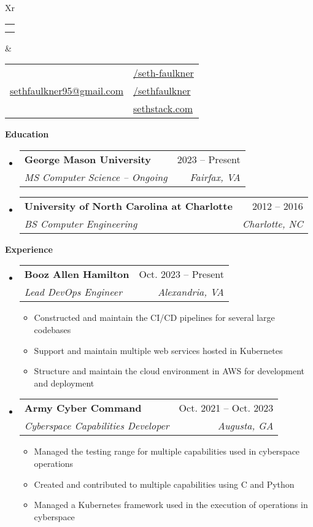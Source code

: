 \documentclass[letterpaper,12pt]{article}[leftmargin=*]
\makeatletter
\def \fullname {Seth Faulkner}
\def \subtitle {}
\def \linkedinicon {\faLinkedin}
\def \linkedinlink {https://www.linkedin.com/in/seth-faulkner-38322184/}
\def \linkedintext {/seth-faulkner}
\def \phoneicon {\faPhone}
\def \phonetext {704.277.7087}
\def \emailicon {\faEnvelope}
\def \emaillink {mailto:sethfaulkner95@gmail.com}
\def \emailtext {sethfaulkner95@gmail.com}
\def \githubicon {\faGithub}
\def \githublink {https://github.com/sethfaulkner}
\def \githubtext {/sethfaulkner}
\def \websiteicon {\faGlobe}
\def \websitelink {http://sethstack.com/}
\def \websitetext {sethstack.com}
\def \headertype {\doublecol} %
\def \entryspacing {-0pt}
\def \linkedin {\linkedinicon \hspace{3pt}\href{\linkedinlink}{\linkedintext}}
\def \phone {\phoneicon \hspace{3pt}{ \phonetext}}
\def \email {\emailicon \hspace{3pt}\href{\emaillink}{\emailtext}}
\def \github {\githubicon \hspace{3pt}\href{\githublink}{\githubtext}}
\def \website {\websiteicon \hspace{3pt}\href{\websitelink}{\websitetext}}
\renewcommand{\section}[2]{\vspace{5pt}
  \colorbox{secondary}{\color{white}\raggedbottom\normalsize\textbf{{#1}{\hspace{7pt}#2}}}
}
\newcommand{\resumeEntryStart}{\begin{itemize}[leftmargin=2.5mm]}
\newcommand{\resumeEntryEnd}{\end{itemize}\vspace{\entryspacing}}
\newcommand{\resumeItemListStart}{\begin{itemize}[leftmargin=4.5mm]}
\newcommand{\resumeItemListEnd}{\end{itemize}}
\newcommand{\resumeItem}[1]{
  \item\small{
    {#1 \vspace{-2pt}}
  }
}
\newcommand{\resumeEntryTSDL}[4]{
  \vspace{-1pt}\item[]
    \begin{tabularx}{0.97\textwidth}{X@{\hspace{60pt}}r}
      \textbf{\color{primary}#1} & {\firabook\color{accent}\small#2} \\
      \textit{\color{accent}\small#3} & \textit{\color{accent}\small#4} \\
    \end{tabularx}\vspace{-6pt}
}
\newcommand{\doublecol}[6]{
  \begin{tabularx}{\textwidth}{Xr}
    {
      \begin{tabular}[c]{l}
        \fontsize{35}{45}\selectfont{\color{primary}{{\textbf{\fullname}}}} \\
        {\textit{\subtitle}} %
      \end{tabular}
    } & {
      \begin{tabular}[c]{l@{\hspace{1.5em}}l}
        {\small#4} & {\small#1} \\
        {\small#5} & {\small#2} \\
        {\small#6} & {\small#3}
      \end{tabular}
    }
  \end{tabularx}
}
\newcommand{\singlecol}[6]{
  \begin{tabularx}{\textwidth}{Xr}
    {
      \begin{tabular}[b]{l}
        \fontsize{35}{45}\selectfont{\color{primary}{{\textbf{\fullname}}}} \\
        {\textit{\subtitle}} %
      \end{tabular}
    } & {
      \begin{tabular}[c]{l}
        {\small#1} \\
        {\small#2} \\
        {\small#3} \\
        {\small#4} \\
        {\small#5} \\
        {\small#6}
      \end{tabular}
    }
  \end{tabularx}
}
\makeatother
\begin{document}


\headertype{\linkedin}{\github}{\website}{\phone}{\email}{} %
\vspace{-10pt} %

\section{\faGraduationCap}{Education}

  \resumeEntryStart
    \resumeEntryTSDL
      {George Mason University}{2023 -- Present}
      {MS Computer Science -- Ongoing}{Fairfax, VA}
  \resumeEntryEnd

  \resumeEntryStart
    \resumeEntryTSDL
      {University of North Carolina at Charlotte}{2012 -- 2016}
      {BS Computer Engineering}{Charlotte, NC}
  \resumeEntryEnd

\section{\faPieChart}{Experience}

  \resumeEntryStart
    \resumeEntryTSDL
      {Booz Allen Hamilton}{Oct. 2023 -- Present}
      {Lead DevOps Engineer}{Alexandria, VA}
    \resumeItemListStart
      \resumeItem {Constructed and maintain the CI/CD pipelines for several large codebases}
      \resumeItem {Support and maintain multiple web services hosted in Kubernetes}
      \resumeItem {Structure and maintain the cloud environment in AWS for development and deployment}
    \resumeItemListEnd
  \resumeEntryEnd

  \resumeEntryStart
    \resumeEntryTSDL
      {Army Cyber Command}{Oct. 2021 -- Oct. 2023}
      {Cyberspace Capabilities Developer}{Augusta, GA}
    \resumeItemListStart
      \resumeItem {Managed the testing range for multiple capabilities used in cyberspace operations}
      \resumeItem {Created and contributed to multiple capabilities using C and Python}
      \resumeItem {Managed a Kubernetes framework used in the execution of operations in cyberspace}
    \resumeItemListEnd
  \resumeEntryEnd
\end{document}
